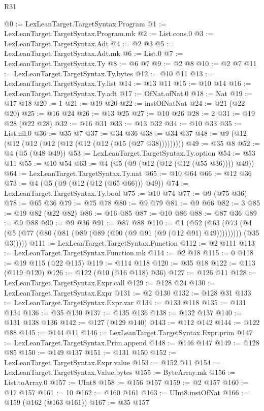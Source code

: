 \begin{lexlean}{R31}
\begin{coremodule}
@0 := LexLeanTarget.TargetSyntax.Program
@1 := LexLeanTarget.TargetSyntax.Program.mk
@2 := List.cons.{0}
@3 := LexLeanTarget.TargetSyntax.Adt
@4 := @2 @3
@5 := LexLeanTarget.TargetSyntax.Adt.mk
@6 := List.{0}
@7 := LexLeanTarget.TargetSyntax.Ty
@8 := @6 @7
@9 := @2 @8
@10 := @2 @7
@11 := LexLeanTarget.TargetSyntax.Ty.bytes
@12 := @10 @11
@13 := LexLeanTarget.TargetSyntax.Ty.list
@14 := @13 @11
@15 := @10 @14
@16 := LexLeanTarget.TargetSyntax.Ty.adt
@17 := OfNat.ofNat.{0}
@18 := Nat
@19 := @17 @18
@20 := 1
@21 := @19 @20
@22 := instOfNatNat
@24 := @21 (@22 @20)
@25 := @16 @24
@26 := @13 @25
@27 := @10 @26
@28 := 2
@31 := @19 @28 (@22 @28)
@32 := @16 @31
@33 := @13 @32
@34 := @10 @33
@35 := List.nil.{0}
@36 := @35 @7
@37 := @34 @36
@38 := @34 @37
@48 := @9 (@12 (@12 (@12 (@12 (@12 (@12 (@12 (@15 (@27 @38)))))))))
@49 := @35 @8
@52 := @4 (@5 (@48 @49))
@53 := LexLeanTarget.TargetSyntax.Ty.option
@54 := @53 @11
@55 := @10 @54
@63 := @4 (@5 (@9 (@12 (@12 (@12 (@55 @36)))) @49))
@64 := LexLeanTarget.TargetSyntax.Ty.nat
@65 := @10 @64
@66 := @12 @36
@73 := @4 (@5 (@9 (@12 (@12 (@65 @66))) @49))
@74 := LexLeanTarget.TargetSyntax.Ty.bool
@75 := @10 @74
@77 := @9 (@75 @36)
@78 := @65 @36
@79 := @75 @78
@80 := @9 @79
@81 := @9 @66
@82 := 3
@85 := @19 @82 (@22 @82)
@86 := @16 @85
@87 := @10 @86
@88 := @87 @36
@89 := @9 @88
@90 := @9 @36
@91 := @87 @88
@110 := @1
    (@52
      (@63
        (@73 (@4 (@5 (@77 (@80 (@81 (@89 (@89 (@90 (@9 @91 (@9 (@12 @91) @49))))))))) (@35 @3)))))
@111 := LexLeanTarget.TargetSyntax.Function
@112 := @2 @111
@113 := LexLeanTarget.TargetSyntax.Function.mk
@114 := @2 @18
@115 := 0
@118 := @19 @115 (@22 @115)
@119 := @114 @118
@120 := @35 @18
@122 := @113 (@119 @120)
@126 := @122 (@10 (@16 @118) @36)
@127 := @126 @11
@128 := LexLeanTarget.TargetSyntax.Expr.call
@129 := @128 @24
@130 := LexLeanTarget.TargetSyntax.Expr
@131 := @2 @130
@132 := @128 @31
@133 := LexLeanTarget.TargetSyntax.Expr.var
@134 := @133 @118
@135 := @131 @134
@136 := @35 @130
@137 := @135 @136
@138 := @132 @137
@140 := @131 @138 @136
@142 := @127 (@129 @140)
@143 := @112 @142
@144 := @122 @88
@145 := @144 @11
@146 := LexLeanTarget.TargetSyntax.Expr.prim
@147 := LexLeanTarget.TargetSyntax.Prim.append
@148 := @146 @147
@149 := @128 @85
@150 := @149 @137
@151 := @131 @150
@152 := LexLeanTarget.TargetSyntax.Expr.value
@153 := @152 @11
@154 := LexLeanTarget.TargetSyntax.Value.bytes
@155 := ByteArray.mk
@156 := List.toArray.{0}
@157 := UInt8
@158 := @156 @157
@159 := @2 @157
@160 := @17 @157
@161 := 10
@162 := @160 @161
@163 := UInt8.instOfNat
@166 := @159 (@162 (@163 @161))
@167 := @35 @157

\end{coremodule}
\end{lexlean}
